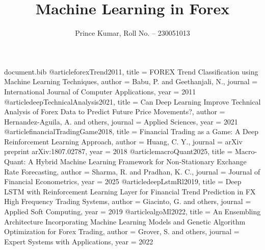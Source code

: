 \begin{filecontents*}{document.bib}
@article{forexTrend2011,
	title   = {FOREX Trend Classification using Machine Learning Techniques},
	author  = {Babu, P. and Geethanjali, N.},
	journal = {International Journal of Computer Applications},
	year    = {2011}
}
@article{deepTechnicalAnalysis2021,
	title   = {Can Deep Learning Improve Technical Analysis of Forex Data to Predict Future Price Movements?},
	author  = {Hernandez-Aguila, A. and others},
	journal = {Applied Sciences},
	year    = {2021}
}
@article{financialTradingGame2018,
	title   = {Financial Trading as a Game: A Deep Reinforcement Learning Approach},
	author  = {Huang, C. Y.},
	journal = {arXiv preprint arXiv:1807.02787},
	year    = {2018}
}
@article{macroQuant2025,
	title   = {Macro-Quant: A Hybrid Machine Learning Framework for Non-Stationary Exchange Rate Forecasting},
	author  = {Sharma, R. and Pradhan, K. C.},
	journal = {Journal of Financial Econometrics},
	year    = {2025}
}
@article{deepLstmRl2019,
	title   = {Deep LSTM with Reinforcement Learning Layer for Financial Trend Prediction in FX High Frequency Trading Systems},
	author  = {Giacinto, G. and others},
	journal = {Applied Soft Computing},
	year    = {2019}
}
@article{algoMl2022,
	title   = {An Ensembling Architecture Incorporating Machine Learning Models and Genetic Algorithm Optimization for Forex Trading},
	author  = {Grover, S. and others},
	journal = {Expert Systems with Applications},
	year    = {2022}
}
\end{filecontents*}

\documentclass[11pt,oneside,letterpaper,english]{article}

\usepackage[T1]{fontenc}
\usepackage[utf8]{inputenc}
\usepackage[margin=2.0cm,headheight=24pt,includeheadfoot]{geometry}
\usepackage[english]{babel}
\usepackage{titlesec}
\usepackage{amsmath,amssymb}
\usepackage{mathptmx}
\usepackage[colorlinks=true,linkcolor=black,urlcolor=blue,citecolor=blue]{hyperref}
\usepackage{graphicx}
\usepackage{fancyhdr}
\usepackage{lastpage}
\usepackage{caption}
\usepackage{tocloft}
\usepackage{setspace}
\usepackage{booktabs}
\usepackage{array}
\usepackage{tabularx}
\usepackage{longtable}
\usepackage{enumitem}
\usepackage[protrusion=true,expansion=false]{microtype}
\usepackage[numbers]{natbib}
\usepackage{float}
\usepackage{url}

\graphicspath{{figures/}{root/}}


\title{Machine Learning in Forex}
\author{Prince Kumar, Roll No. -- 230051013}
\newcommand{\supervisorname}{Prof. Raghunath Sahu\\Dr. Kalindi C. Pradhan}

